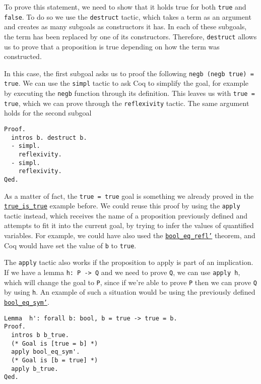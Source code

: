 To prove this statement, we need to show that it holds true for both \texttt{true} and 
\texttt{false}. To do so we use the \texttt{destruct} tactic, which takes a term as
an argument and creates as many subgoals as constructors it has. In each of these subgoals, the term
has been replaced by one of its constructors. Therefore, \texttt{destruct} allows us to prove
that a proposition is true depending on how the term was constructed.

In this case, the first subgoal asks us to proof the following \texttt{negb (negb true) = true}.
We can use the \texttt{simpl} tactic to ask Coq to simplify the goal, for example by executing
the \texttt{negb} function through its definition. This leaves us with 
\texttt{true = true}, which we can prove through the \texttt{reflexivity} tactic. The
same argument holds for the second subgoal

\begin{verbatim}
Proof.
  intros b. destruct b.
  - simpl.
    reflexivity.
  - simpl.
    reflexivity. 
Qed.
\end{verbatim}

As a matter of fact, the \texttt{true = true} goal is something we already proved in the
\hyperref[lst:true-is-true]{\texttt{true_is_true}} example before. We could reuse this proof
by using the \texttt{apply} tactic instead, which receives the name of a proposition previously
defined and attempts to fit it into the current goal, by trying to infer the values of quantified 
variables. For example, we could have also used the 
\hyperref[lst:bool-eq-refl]{\texttt{bool_eq_refl'}} theorem, and Coq would have set the value of
\texttt{b} to \texttt{true}.

The \texttt{apply} tactic also works if the proposition to apply is part of an implication.
If we have a lemma \texttt{h: P -> Q} and we need to prove \texttt{Q}, we can use
\texttt{apply h}, which will change the goal to \texttt{P}, since if we're able to
prove \texttt{P} then we can prove \texttt{Q} by using \texttt{h}. An example
of such a situation would be using the previously defined 
\hyperref[lst:bool-eq-sym]{\texttt{bool_eq_sym'}}.

\begin{verbatim}
Lemma  h': forall b: bool, b = true -> true = b.
Proof.
  intros b b_true.
  (* Goal is [true = b] *)
  apply bool_eq_sym'.
  (* Goal is [b = true] *)
  apply b_true.
Qed.
\end{verbatim}

